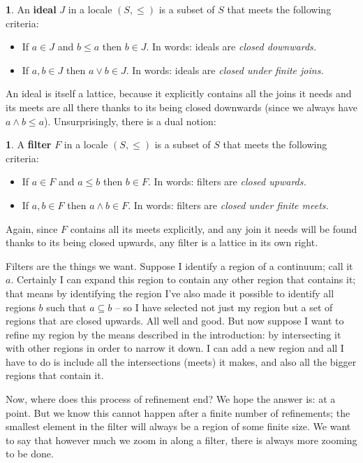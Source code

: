 \documentclass[oneside,english]{amsbook}
\numberwithin{section}{chapter}
\theoremstyle{plain}
\theoremstyle{definition}
\newtheorem{defn}[thm]{\protect\definitionname}
\providecommand{\definitionname}{Definition}
\begin{document}
\begin{defn} 
	An \textbf{ideal} $J$ in a locale $(S,\le)$ is a subset of $S$ that meets the following criteria: 
	\begin{itemize} 
		\item If $a\in J$ and $b\le a$ then $b\in J$. In words: ideals are \emph{closed downwards.} 
		\item If $a,b\in J$ then $a\lor b\in J$. In words: ideals are \emph{closed under finite joins.} 
	\end{itemize} 
\end{defn}

An ideal is itself a lattice, because it explicitly contains all the joins it needs and its meets are all there thanks to its being closed downwards (since we always have $a\land b\le a$). Unsurprisingly, there is a dual notion: 

\begin{defn} 
	A \textbf{filter} $F$ in a locale $(S,\le)$ is a subset of $S$ that meets the following criteria: 
	\begin{itemize} 
		\item If $a\in F$ and $a\le b$ then $b\in F$. In words: filters are \emph{closed upwards.} 
		\item If $a,b\in F$ then $a\land b\in F$. In words: filters are \emph{closed under finite meets.} 
	\end{itemize} 
\end{defn} 

Again, since $F$ contains all its meets explicitly, and any join it needs will be found thanks to its being closed upwards, any filter is a lattice in its own right.

Filters are the things we want. Suppose I identify a region of a continuum; call it $a$. Certainly I can expand this region to contain any other region that contains it; that means by identifying the region I've also made it possible to identify all regions $b$ such that $a\subseteq b$ -- so I have selected not just my region but a set of regions that are closed upwards. All well and good. But now suppose I want to refine my region by the means described in the introduction: by intersecting it with other regions in order to narrow it down. I can add a new region and all I have to do is include all the intersections (meets) it makes, and also all the bigger regions that contain it. 

Now, where does this process of refinement end? We hope the answer is: at a point. But we know this cannot happen after a finite number of refinements; the smallest element in the filter will always be a region of some finite size. We want to say that however much we zoom in along a filter, there is always more zooming to be done. 
\end{document}
